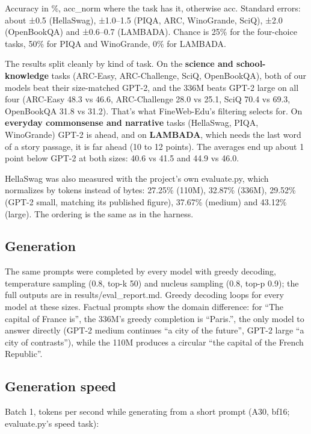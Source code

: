 \documentclass[11pt]{article}
\begin{document}
Accuracy in \%, acc\_\allowbreak{}norm where the task has it, otherwise acc. Standard errors: about ±0.5 (HellaSwag), ±1.0–1.5 (PIQA, ARC, WinoGrande, SciQ), ±2.0 (OpenBookQA) and ±0.6–0.7 (LAMBADA). Chance is 25\% for the four-choice tasks, 50\% for PIQA and WinoGrande, 0\% for LAMBADA.

The results split cleanly by kind of task. On the \textbf{science and school-knowledge} tasks (ARC-Easy, ARC-Challenge, SciQ, OpenBookQA), both of our models beat their size-matched GPT-2, and the 336M beats GPT-2 large on all four (ARC-Easy 48.3 vs 46.6, ARC-Challenge 28.0 vs 25.1, SciQ 70.4 vs 69.3, OpenBookQA 31.8 vs 31.2). That's what FineWeb-Edu's filtering selects for. On \textbf{everyday commonsense and narrative} tasks (HellaSwag, PIQA, WinoGrande) GPT-2 is ahead, and on \textbf{LAMBADA}, which needs the last word of a story passage, it is far ahead (10 to 12 points). The averages end up about 1 point below GPT-2 at both sizes: 40.6 vs 41.5 and 44.9 vs 46.0.

HellaSwag was also measured with the project's own evaluate.py, which normalizes by tokens instead of bytes: 27.25\% (110M), 32.87\% (336M), 29.52\% (GPT-2 small, matching its published figure), 37.67\% (medium) and 43.12\% (large). The ordering is the same as in the harness.

\subsection{Generation}

The same prompts were completed by every model with greedy decoding, temperature sampling (0.8, top-k 50) and nucleus sampling (0.8, top-p 0.9); the full outputs are in results/\allowbreak{}eval\_\allowbreak{}report.md. Greedy decoding loops for every model at these sizes. Factual prompts show the domain difference: for ``The capital of France is'', the 336M's greedy completion is ``Paris.'', the only model to answer directly (GPT-2 medium continues ``a city of the future'', GPT-2 large ``a city of contrasts''), while the 110M produces a circular ``the capital of the French Republic''.

\subsection{Generation speed}

Batch 1, tokens per second while generating from a short prompt (A30, bf16; evaluate.py's speed task):
\end{document}
